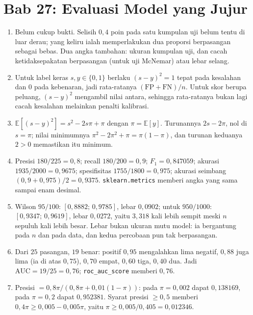 \section*{Bab 27: Evaluasi Model yang Jujur}
\begin{enumerate}[label=\textbf{27.\arabic*}]
  \item Belum cukup bukti. Selisih $0{,}4$ poin pada satu kumpulan uji belum tentu
        di luar derau; yang keliru ialah memperlakukan dua proporsi berpasangan
        sebagai bebas. Dua angka tambahan: ukuran kumpulan uji, dan cacah
        ketidaksepakatan berpasangan (untuk uji McNemar) atau lebar selang.

  \item Untuk label keras $s,y\in\{0,1\}$ berlaku $(s-y)^{2}=1$ tepat pada
        kesalahan dan $0$ pada kebenaran, jadi rata-ratanya
        $(\mathrm{FP}+\mathrm{FN})/n$. Untuk skor berupa peluang, $(s-y)^{2}$
        mengambil nilai antara, sehingga rata-ratanya bukan lagi cacah kesalahan
        melainkan penalti kalibrasi.

  \item $\mathbb{E}[(s-y)^{2}]=s^{2}-2s\pi+\pi$ dengan $\pi=\mathbb{E}[y]$.
        Turunannya $2s-2\pi$, nol di $s=\pi$; nilai minimumnya
        $\pi^{2}-2\pi^{2}+\pi=\pi(1-\pi)$, dan turunan keduanya $2>0$ memastikan
        itu minimum.

  \item Presisi $180/225=0{,}8$; recall $180/200=0{,}9$; $F_{1}=0{,}847059$;
        akurasi $1935/2000=0{,}9675$; spesifisitas $1755/1800=0{,}975$; akurasi
        seimbang $(0{,}9+0{,}975)/2=0{,}9375$. \texttt{sklearn.metrics} memberi
        angka yang sama sampai enam desimal.

  \item Wilson $95/100$: $[0{,}8882;\,0{,}9785]$, lebar $0{,}0902$; untuk
        $950/1000$: $[0{,}9347;\,0{,}9619]$, lebar $0{,}0272$, yaitu $3{,}318$
        kali lebih sempit meski $n$ sepuluh kali lebih besar. Lebar bukan ukuran
        mutu model: ia bergantung pada $n$ dan pada data, dan kedua percobaan pun
        tak berpasangan.

  \item 
Dari $25$ pasangan, $19$ benar: positif $0{,}95$ mengalahkan lima negatif,
        $0{,}88$ juga lima (ia di atas $0{,}75$), $0{,}70$ empat, $0{,}60$ tiga,
        $0{,}40$ dua. Jadi $\mathrm{AUC}=19/25=0{,}76$; \texttt{roc\_auc\_score}
        memberi $0{,}76$.

  \item Presisi $=0{,}8\pi/(0{,}8\pi+0{,}01(1-\pi))$: pada $\pi=0{,}002$ dapat
        $0{,}138169$, pada $\pi=0{,}2$ dapat $0{,}952381$. Syarat presisi
        $\ge0{,}5$ memberi $0{,}4\pi\ge0{,}005-0{,}005\pi$, yaitu
        $\pi\ge0{,}005/0{,}405=0{,}012346$.


\end{enumerate}
